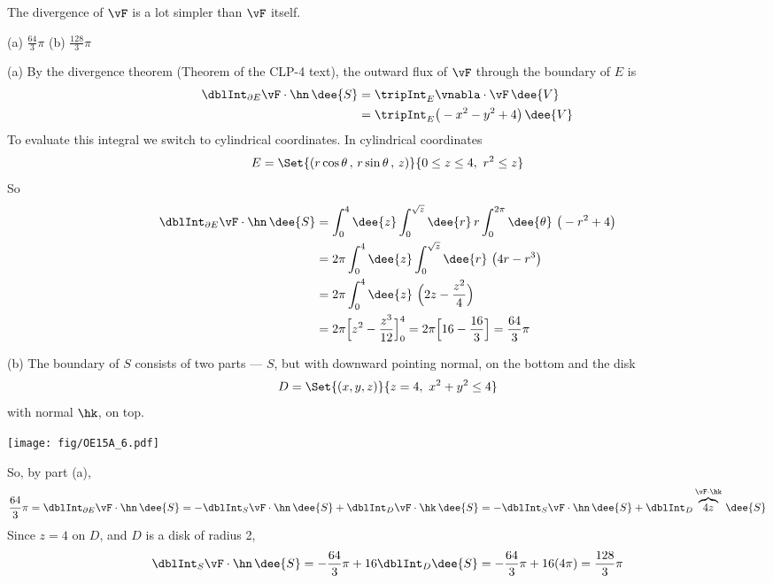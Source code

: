 \begin{hint} 
The divergence of $\vF$ is a lot simpler than $\vF$ itself.
\end{hint}

\begin{answer} 
(a) $\frac{64}{3}\pi$\qquad
(b) $\frac{128}{3}\pi$
\end{answer}

\begin{solution} (a)
By the divergence theorem (Theorem  of the 
CLP-4 text), the outward flux of $\vF$ through the boundary of $E$ is
\begin{align*}
\dblInt_{\partial E}\vF\cdot\hn\,\dee{S}
&=\tripInt_E \vnabla\cdot\vF\,\dee{V} \\
&=\tripInt_E \big(-x^2-y^2+4\big)\,\dee{V} 
\end{align*}
To evaluate this integral we switch to cylindrical coordinates.
In cylindrical coordinates
\begin{equation*}
E=\Set{(r\cos\theta\,,\,r\sin\theta\,,\,z)}{0\le z\le 4,\ r^2\le z}
\end{equation*}
So
\begin{align*}
\dblInt_{\partial E}\vF\cdot\hn\,\dee{S}
&=\int_0^4\dee{z}\int_0^{\sqrt{z}}\dee{r}\,r\int_0^{2\pi}\dee{\theta}\ 
         \big(-r^2+4\big) \\
&=2\pi \int_0^4\dee{z}\int_0^{\sqrt{z}}\dee{r}\ \big(4r-r^3\big) \\
&=2\pi \int_0^4\dee{z}\ \Big(2z-\frac{z^2}{4}\Big) \\
&= 2\pi\Big[z^2-\frac{z^3}{12}\Big]_0^4
=2\pi\Big[16-\frac{16}{3}\Big]
=\frac{64}{3}\pi
\end{align*}

(b) The boundary of $S$ consists of two parts --- $S$, but with downward
pointing normal, on the bottom and the disk
\begin{equation*}
D =\Set{(x,y,z)}{z=4,\ x^2+y^2\le 4}
\end{equation*} 
with normal $\hk$, on top.
 \begin{center}
    \texttt{[image: fig/OE15A\_6.pdf]}
\end{center}
So, by part (a),
\begin{align*}
\frac{64}{3}\pi =\dblInt_{\partial E}\vF\cdot\hn\,\dee{S}
=-\dblInt_S \vF\cdot\hn\,\dee{S} 
  +\dblInt_D \vF\cdot\hk\,\dee{S}
=-\dblInt_S \vF\cdot\hn\,\dee{S} 
  +\dblInt_D \overbrace{4z}^{\vF\cdot\hk}\,\dee{S}
\end{align*}
Since $z=4$ on $D$, and $D$ is a disk of radius 2,
\begin{align*}
\dblInt_S \vF\cdot\hn\,\dee{S} 
=-\frac{64}{3}\pi +16\dblInt_D \dee{S}
=-\frac{64}{3}\pi +16(4\pi)
=\frac{128}{3}\pi
\end{align*}
\end{solution}

